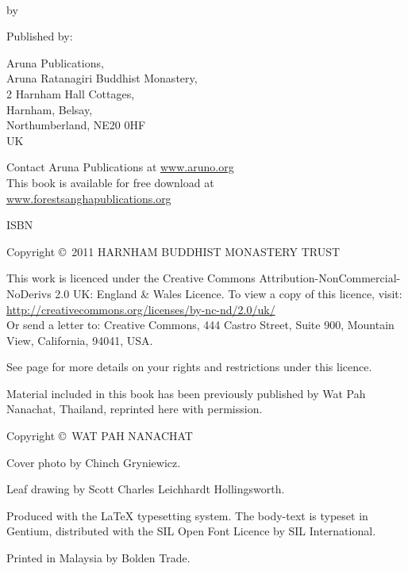 {\smaller\setlength{\parskip}{0.8em}\setlength{\parindent}{0em}%
{\raggedright%

\bookTitle \\
by \bookAuthor

Published by:

Aruna Publications,\\
Aruna Ratanagiri Buddhist Monastery,\\
2 Harnham Hall Cottages,\\
Harnham, Belsay,\\
Northumberland, NE20 0HF\\
UK

Contact Aruna Publications at \href{http://aruno.org}{www.aruno.org}\\
This book is available for free download at\\
\href{http://forestsanghapublications.org/}{www.forestsanghapublications.org}

ISBN \bookISBN

Copyright \copyright\ 2011 HARNHAM BUDDHIST MONASTERY TRUST

\vfill

{\tiny

This work is licenced under the Creative Commons Attribution-NonCommercial-NoDerivs 2.0 UK: England \& Wales Licence. To view a copy of this licence, visit:\\
\href{http://creativecommons.org/licenses/by-nc-nd/2.0/uk/}{http://creativecommons.org/licenses/by-nc-nd/2.0/uk/}\\
Or send a letter to: Creative Commons, 444 Castro Street, Suite 900, Mountain View, California, 94041, USA.

See page \pageref{cc-details} for more details on your rights and restrictions under this licence.

Material included in this book has been previously published by Wat Pah Nanachat, Thailand, reprinted here with permission.

Copyright \copyright\ WAT PAH NANACHAT

Cover photo by Chinch Gryniewicz.

Leaf drawing by Scott Charles Leichhardt Hollingsworth.

Produced with the {\selectfont\LaTeX} typesetting system. The body-text is typeset in Gentium, distributed with the SIL Open Font Licence by SIL International.

\editioninfo

Printed in Malaysia by Bolden Trade.

}

}}


